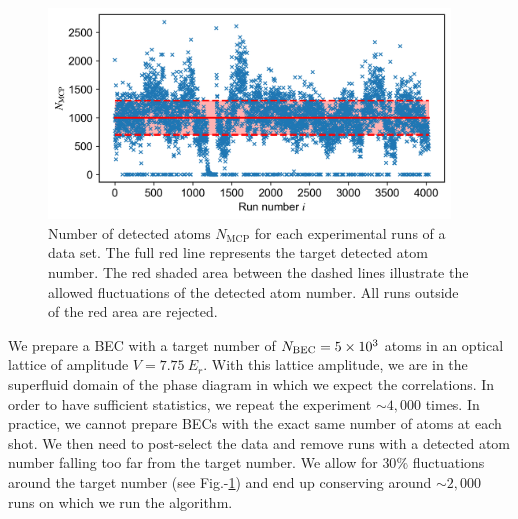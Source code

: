 \begin{figure}[]
    \centering
    \includegraphics[width=0.95\textwidth]{Fig/Chapter4/n_fluctuations.png}
    \caption{Number of detected atoms $N_{\mathrm{MCP}}$ for each experimental runs of a data set. The full red line represents the target detected atom number. The red shaded area between the dashed lines illustrate the allowed fluctuations of the detected atom number. All runs outside of the red area are rejected.}
    \label{fig:n_fluctuations}
\end{figure}

We prepare a BEC with a target number of $N_{\rm{BEC}}=5 \times 10^3$ atoms in an optical lattice of amplitude $V=7.75 \ E_r$. With this lattice amplitude, we are in the superfluid domain of the phase diagram in which we expect the \kmk correlations. In order to have sufficient statistics, we repeat the experiment $\sim 4,000$ times. In practice, we cannot prepare BECs with the exact same number of atoms at each shot. We then need to post-select the data and remove runs with a detected atom number falling too far from the target number. We allow for $30 \%$ fluctuations around the target number (see Fig.-\ref{fig:n_fluctuations}) and end up conserving around $\sim 2,000$ runs on which we run the algorithm.

